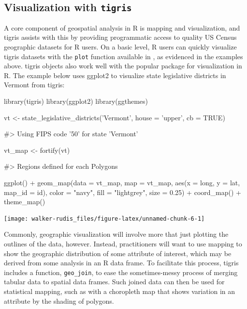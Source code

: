 \subsection{\texorpdfstring{Visualization with
\texttt{tigris}}{Visualization with tigris}}\label{visualization-with-tigris}

A core component of geospatial analysis in R is mapping and
visualization, and tigris assists with this by providing programmatic
access to quality US Census geographic datasets for R users. On a basic
level, R users can quickly visualize tigris datasets with the
\texttt{plot} function available in , as evidenced in the
examples above. tigris objects also work well with the popular
 package for visualization in R. The example below uses
ggplot2 to visualize state legislative districts in Vermont from tigris:

\begin{Schunk}
\begin{Sinput}
library(tigris)
library(ggplot2)
library(ggthemes)

vt <- state_legislative_districts('Vermont', house = 'upper', cb = TRUE)
\end{Sinput}
\begin{Soutput}
#> Using FIPS code '50' for state 'Vermont'
\end{Soutput}
\begin{Sinput}
vt_map <- fortify(vt)
\end{Sinput}
\begin{Soutput}
#> Regions defined for each Polygons
\end{Soutput}
\begin{Sinput}
ggplot() + 
  geom_map(data = vt_map, map = vt_map, 
           aes(x = long, y = lat, map_id = id), 
           color = "navy", fill = "lightgrey", 
           size = 0.25) + 
  coord_map() + 
  theme_map()
\end{Sinput}

\texttt{[image: walker-rudis\_files/figure-latex/unnamed-chunk-6-1]} \end{Schunk}

Commonly, geographic visualization will involve more that just plotting
the outlines of the data, however. Instead, practitioners will want to
use mapping to show the geographic distribution of some attribute of
interest, which may be derived from some analysis in an R data frame. To
facilitate this process, tigris includes a function, \texttt{geo\_join},
to ease the sometimes-messy process of merging tabular data to spatial
data frames. Such joined data can then be used for statistical mapping,
such as with a choropleth map that shows variation in an attribute by
the shading of polygons.

